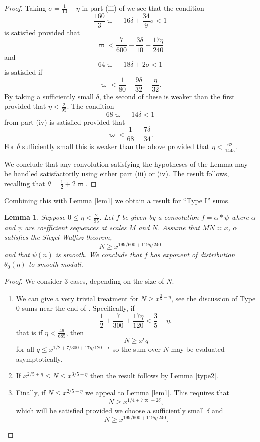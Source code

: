 \documentclass[12pt]{amsart}
\theoremstyle{plain}
\newtheorem{lem}{Lemma}
\theoremstyle{definition}
\numberwithin{equation}{section}
\begin{document}
\begin{proof}
Taking $\sigma=\frac{1}{10}-\eta$ in part (iii) of \cite[Theorem 2.8]{polymath8a} we see that the condition 
$$\frac{160}{3} \varpi + 16\delta + \frac{34}{9} \sigma < 1$$
is satisfied provided that
$$\varpi <\frac{7}{600}-\frac{3\delta}{10}+\frac{17\eta}{240}$$
and 
$$64\varpi + 18 \delta + 2\sigma < 1$$
is satisfied if 
$$\varpi <\frac1{80}-\frac{9\delta}{32}+\frac{\eta}{32}.$$
By taking a sufficiently small $\delta$, the second of these is weaker than the first provided that $\eta<\frac{2}{95}$.  The condition 
$$68\varpi+14\delta<1$$
from part (iv) is satisfied provided that 
$$\varpi<\frac{1}{68}-\frac{7\delta}{34}.$$
For $\delta$ sufficiently small this is weaker than the above provided that $\eta<\frac{62}{1445}$. 

We conclude that any convolution satisfying the hypotheses of the Lemma may be handled satisfactorily using either part (iii) or (iv).  The result follows, recalling that $\theta=\frac12+2\varpi$.
\end{proof}

Combining this with Lemma \ref{lem1} we obtain a result for ``Type I'' sums.

\begin{lem}\label{type1}
Suppose $0\leq \eta<\frac{2}{95}$.   Let $f$ be given by a convolution $f=\alpha*\psi$ where $\alpha$ and $\psi$ are coefficient sequences at scales $M$ and $N$.  Assume that $MN\asymp x$, $\alpha$ satisfies the Siegel-Walfisz theorem, 
$$N\geq x^{199/600+119\eta/240}$$
and that $\psi(n)$ is smooth. We conclude that $f$ has exponent of distribution $\theta_0(\eta)$ to smooth moduli.
\end{lem}

\begin{proof}
We consider $3$ cases, depending on the size of $N$.

\begin{enumerate}
\item We can give a very trivial treatment for $N\geq x^{\frac35-\eta}$, see the discussion of Type 0 sums near the end of \cite[Section 3]{polymath8a}.  Specifically, if 
$$\frac{1}{2}+\frac{7}{300}+\frac{17\eta}{120}<\frac{3}{5}-\eta,$$
that is if $\eta<\frac{46}{685}$, then 
$$N\geq x^{\epsilon}q$$
for all $q\leq x^{1/2+7/300+17\eta/120-\epsilon}$ so the sum over $N$ may be evaluated asymptotically.

\item If $x^{2/5+\eta}\leq N\leq x^{3/5-\eta}$ then the result follows by Lemma \ref{type2}.

\item Finally, if $N\leq x^{2/5+\eta}$ we appeal to Lemma \ref{lem1}.  This requires that 
$$N\geq x^{1/4+7\varpi+2\delta},$$
which will be satisfied provided we choose a sufficiently small $\delta$ and 
$$N\geq x^{199/600+119\eta/240}.$$
\end{enumerate}
\end{proof}
\end{document}
